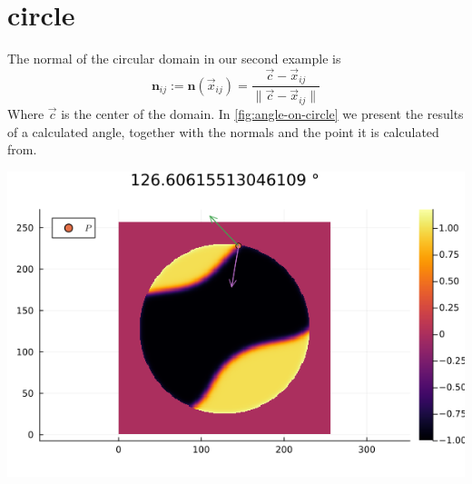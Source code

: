 \documentclass{mimosis}
\begin{document}
\section{circle}
\label{sec:org5287096}
The normal of the circular domain in our second example is
\begin{equation}
\label{eq:3}
\mathbf{n}_{ij} := \mathbf{n}(\vec{x}_{ij}) = \frac{\vec{c} - \vec{x}_{ij}}{\| \vec{c} - \vec{x}_{ij}\|}
\end{equation}
Where \(\vec{c}\) is the center of the domain.
In \ref{fig:angle-on-circle} we present the results of a calculated angle, together with the normals and the point it is calculated from.
\begin{center}
\includegraphics[width=.9\linewidth]{images/angle-circle.png}
\label{fig:angle-on-circle}
\end{center}
\end{document}
